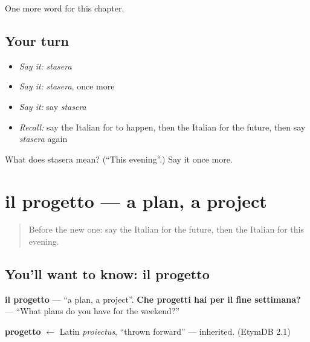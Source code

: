 \begin{grammarlens}[title={What you've built}]
One more word for this chapter.
\end{grammarlens}

\subsection*{Your turn}
\begin{itemize}
\raggedright
  \item \emph{Say it:} \emph{stasera}
  \item \emph{Say it:} \emph{stasera}, once more
  \item \emph{Say it:} say \emph{stasera}
  \item \emph{Recall:} say the Italian for to happen, then the Italian for the future, then say \emph{stasera} again
\end{itemize}

\begin{tcolorbox}[breakable,colback=teal!4,colframe=teal!35!black,title={Before you move on}]
What does stasera mean? (\textquotedblleft{}This evening\textquotedblright{}.) Say it once more.
\end{tcolorbox}
\section[il progetto]{il progetto — a plan, a project}

\label{lesson:IT-C138-il-progetto}



\begin{quote}
Before the new one: say the Italian for the future, then the Italian for this evening.
\end{quote}

\subsection*{You'll want to know: il progetto}
\textbf{il progetto} — \textquotedblleft{}a plan, a project\textquotedblright{}. \textbf{Che progetti hai per il fine settimana?} — \textquotedblleft{}What plans do you have for the weekend?\textquotedblright{}

\begin{cousinweb}
\textbf{progetto} $\leftarrow$ Latin \emph{proiectus}, \textquotedblleft{}thrown forward\textquotedblright{} — inherited. (EtymDB 2.1)
\end{cousinweb}

